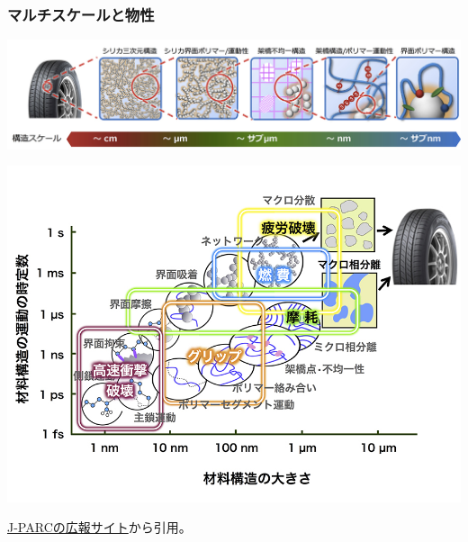 \documentclass[unicode,12pt]{beamer}%
\begin{document}
\begin{frame}
    \frametitle{マルチスケールと物性}
    
    \centering
    \includegraphics[width=.7\textwidth]{press151112_03.jpg}

    \includegraphics[width=.6\textwidth]{press151112_02.jpg}

    \href{http://j-parc.jp/ja/topics/2015/Pulse151112.html}{J-PARCの広報サイト}から引用。
\end{frame}
\end{document}
